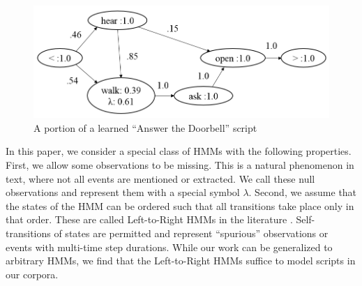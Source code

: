 \documentclass[letterpaper]{article}
\begin{document}
\begin{figure}
\centering
\includegraphics[scale=.35]{pretty.png}
\caption{A portion of a learned ``Answer the Doorbell'' script}
\label{fig:dbscript}
\end{figure}

In this paper, we consider a special class of HMMs with the following
properties. %
First, we allow some observations to be missing. This is a natural phenomenon in text, where not all events are mentioned or extracted. We call these null observations and represent them with a special symbol $\lambda$.  Second, we assume that the states of the HMM can be ordered such that all transitions take place only in that order. These are called Left-to-Right HMMs in the literature \cite{rabiner,bahl}. Self-transitions of states are permitted and represent ``spurious'' observations or events with multi-time step durations. While our work can be generalized to arbitrary HMMs, we find that the Left-to-Right HMMs suffice to model scripts in our corpora.  %
\end{document}
